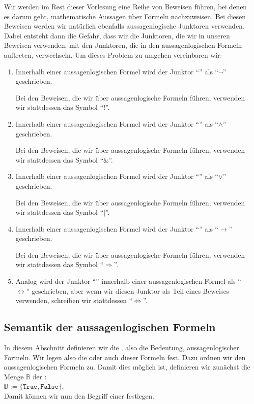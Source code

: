 \remark
Wir werden im Rest dieser Vorlesung eine Reihe von Beweisen führen, bei denen es darum geht,
mathematische Aussagen über Formeln nachzuweisen.  Bei diesen Beweisen werden wir natürlich
ebenfalls aussagenlogische Junktoren verwenden.  Dabei entsteht dann die Gefahr, dass wir die Junktoren,
die wir in unseren Beweisen verwenden, mit den Junktoren, die in den aussagenlogischen Formeln
auftreten, verwechseln.  Um dieses Problem zu umgehen vereinbaren wir:
\begin{enumerate}
\item Innerhalb einer aussagenlogischen Formel wird der Junktor  
      ``'' als ``$\neg$''  geschrieben.
  
      Bei den Beweisen, die wir über aussagenlogische Formeln führen,
      verwenden wir stattdessen das Symbol ``$!$''.

\item Innerhalb einer aussagenlogischen Formel wird der Junktor  
      ``'' als ``$\wedge$''  geschrieben.
  
      Bei den Beweisen, die wir über aussagenlogische Formeln führen,
      verwenden wir stattdessen das Symbol ``$\&$''.
\item Innerhalb einer aussagenlogischen Formel wird der Junktor  
      ``'' als ``$\vee$''  geschrieben.
  
      Bei den Beweisen, die wir über aussagenlogische Formeln führen,
      verwenden wir stattdessen das Symbol ``$|$''.
\item Innerhalb einer aussagenlogischen Formel wird der Junktor  
      ``'' als ``$\rightarrow$''  geschrieben.
  
      Bei den Beweisen, die wir über aussagenlogische Formeln führen,
      verwenden wir stattdessen das Symbol ``$\Rightarrow$''.
\item Analog wird der Junktor ``'' innerhalb einer aussagenlogischen Formel als
      ``$\leftrightarrow$'' geschrieben, aber wenn wir diesen Junktor als Teil eines Beweises verwenden,
      schreiben wir stattdessen ``$\Leftrightarrow$''. \eox      
\end{enumerate}


\subsection{Semantik der aussagenlogischen Formeln}
In diesem Abschnitt definieren wir die , also die Bedeutung, aussagenlogischer Formeln.  Wir
legen also die  oder auch  dieser Formeln fest.  Dazu ordnen wir den
aussagenlogischen Formeln  zu.  Damit dies möglich ist, definieren wir
zunächst die Menge $\mathbb{B}$ der :  \\[0.2cm] 
\hspace*{1.3cm} $\mathbb{B} := \{ \texttt{True}, \texttt{False} \}$. \\[0.2cm]
Damit können wir nun
den Begriff einer  festlegen.

